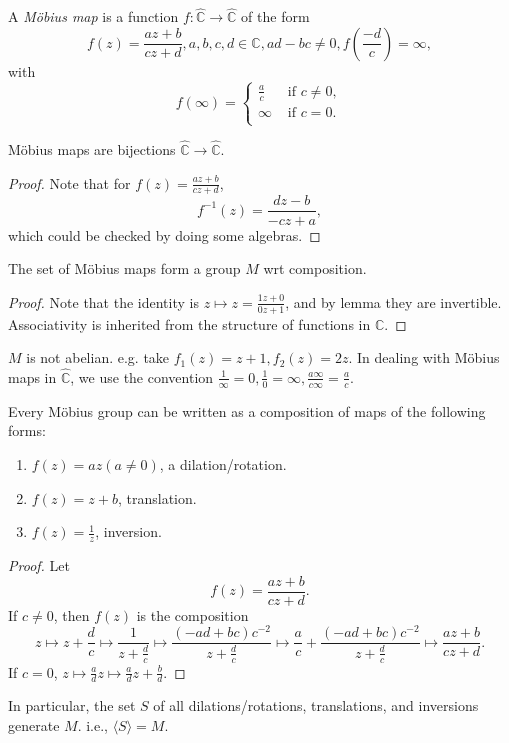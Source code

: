 \documentclass[10pt]{article}
\def\CC{{\mathbb C}}
\begin{document}
    \begin{definition}
        A \textit{M\"{o}bius map} is a function $ f: \hat{\mathbb{C}}\to \hat{\mathbb{C}} $ of the form
        \[
            f(z)=\frac{az+b}{cz+d}, a,b,c,d\in \CC, ad-bc\neq 0, f\left( \frac{-d}{c} \right)=\infty
        ,\]
        with
        \[
            f(\infty)=\begin{cases}
            \frac{a}{c} &\text{ if } c\neq 0,\\
            \infty &\text{ if } c=0.\\
            \end{cases} 
        \]
    \end{definition}
    \begin{lemma}\label{lma:mobius are bijections}
        M\"{o}bius maps are bijections $ \hat{\CC}\to \hat{\CC} $.
    \end{lemma}
    \begin{proof}
        Note that for $ f(z)=\frac{az+b}{cz+d} $, 
        \[
            f^{-1}(z)=\frac{dz-b}{-cz+a}
        ,\]
        which could be checked by doing some algebras.
    \end{proof}
    \begin{theorem}\label{thm:mobius_group}
        The set of M\"{o}bius maps form a group $ M $ wrt composition.
    \end{theorem}
    \begin{proof}
        Note that the identity is $z\mapsto z=\frac{1z+0}{0z+1}$, and by lemma they are invertible. Associativity  is inherited from the structure of functions in $ \mathbb{C} $. 
    \end{proof}
    \begin{remark}
        $M$ is not abelian. e.g. take $ f_1(z)=z+1, f_2(z)=2z $. In dealing with M\"{o}bius maps in $ \hat{\CC} $, we use the convention $ \frac{1}{\infty}=0, \frac{1}{0}=\infty, \frac{a\infty}{c\infty}=\frac{a}{c} $.
    \end{remark}
    \begin{proposition}\label{prop:decomp_mobius}
        Every M\"{o}bius group can be written as a composition of maps of the following forms:
        \begin{enumerate}[(1)]
            \item $ f(z)=az(a\neq 0) $, a dilation/rotation.
            \item $ f(z)=z+b $, translation.
            \item $ f(z)=\frac{1}{z} $, inversion.
        \end{enumerate}
    \end{proposition}
    \begin{proof}
        Let
        \[
            f(z)=\frac{az+b}{cz+d}
        .\]
        If $c\neq 0$, then $ f(z) $ is the composition 
        \[
            z \mapsto z+\frac{d}{c} \mapsto \frac{1}{z+\frac{d}{c}} \mapsto \frac{(-ad+bc)c^{-2}}{z+\frac{d}{c}} \mapsto \frac{a}{c}+\frac{(-ad+bc)c^{-2}}{z+\frac{d}{c}} \mapsto \frac{az+b}{cz+d}
        .\]
        If $c=0$, $ z \mapsto \frac{a}{d}z \mapsto \frac{a}{d}z+\frac{b}{d}. $
    \end{proof}
    In particular, the set $S$ of all dilations/rotations, translations, and inversions generate $M$. i.e., $ \langle S \rangle = M $.
\end{document}
